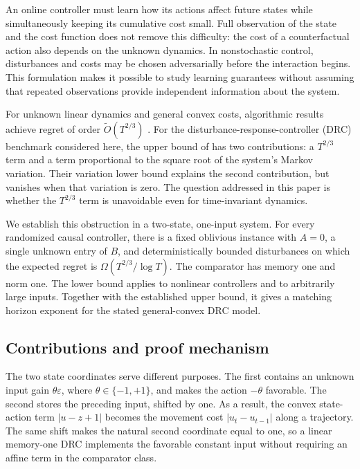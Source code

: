 \documentclass[11pt]{article}
\theoremstyle{remark}
\begin{document}
An online controller must learn how its actions affect future states while
simultaneously keeping its cumulative cost small. Full observation of the
state and the cost function does not remove this difficulty: the cost of a
counterfactual action also depends on the unknown dynamics. In nonstochastic
control, disturbances and costs may be chosen adversarially before the
interaction begins. This formulation makes it possible to study learning
guarantees without assuming that repeated observations provide independent
information about the system.

For unknown linear dynamics and general convex costs, algorithmic results
achieve regret of order $\widetilde O(T^{2/3})$
\citep{hazan,improper,minasyan}. For the disturbance-response-controller
(DRC) benchmark considered here, the upper bound of \citet{minasyan}
has two contributions: a $T^{2/3}$ term and a term proportional to the
square root of the system's Markov variation. Their variation lower bound
explains the second contribution, but vanishes when that variation is zero.
The question addressed in this paper is whether the $T^{2/3}$ term is
unavoidable even for time-invariant dynamics.

We establish this obstruction in a two-state, one-input system. For every
randomized causal controller, there is a fixed oblivious instance with
$A=0$, a single unknown entry of $B$, and deterministically bounded
disturbances on which the expected regret is
$\Omega(T^{2/3}/\log T)$. The comparator has memory one and norm one.
The lower bound applies to nonlinear controllers and to arbitrarily large
inputs. Together with the established upper bound, it gives a matching
horizon exponent for the stated general-convex DRC model.

\subsection{Contributions and proof mechanism}

The two state coordinates serve different purposes. The first contains an
unknown input gain $\theta\varepsilon$, where $\theta\in\{-1,+1\}$,
and makes the action $-\theta$ favorable. The second stores the preceding
input, shifted by one. As a result, the convex state-action term
$|u-z+1|$ becomes the movement cost $|u_t-u_{t-1}|$ along a trajectory.
The same shift makes the natural second coordinate equal to one, so a linear
memory-one DRC implements the favorable constant input without requiring
an affine term in the comparator class.
\end{document}
